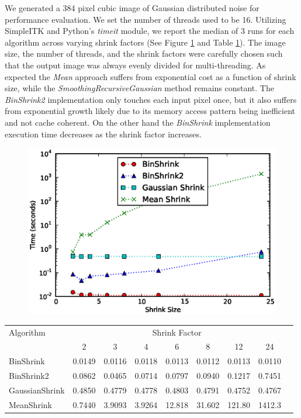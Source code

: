 \documentclass{InsightArticle}
\begin{document}
We generated a 384 pixel cubic image of Gaussian distributed noise for
performance evaluation. We set the number of threads used to be
16. Utilizing SimpleITK and Python's
\textit{timeit} module, we report the median of 3 runs for each
algorithm across varying shrink factors (See Figure
\ref{fig:ShrinkPerformance} and Table \ref{tab:ShrinkPerformance}).  The image size, the number of threads,
and the shrink factors were carefully chosen such that the output
image was always evenly divided for multi-threading. As expected the
\textit{Mean} approach suffers from exponential cost as a function of
shrink size, while the
\textit{SmoothingRecursiveGaussian} method remains constant. The
\textit{BinShrink2} implementation only touches each input pixel once,
but it also suffers from exponential growth likely due to its memory
access pattern being inefficient and not cache coherent. On the other
hand the \textit{BinShrink} implementation execution time decreases as
the shrink factor increases.

\begin{figure}
  \centering
  \includegraphics[width=0.8\linewidth]{images/shrink_time}
  \label{fig:ShrinkPerformance}
\end{figure}

\begin{table}
\begin{center}
\begin{tabular}{l|*{7}{c}r}
Algorithm & \multicolumn{7}{c}{Shrink Factor} \\
  &            2 & 3 & 4 & 6 & 8 & 12 & 24 \\
\hline
BinShrink &     0.0149 & 0.0116 & 0.0118 & 0.0113 & 0.0112 & 0.0113 & 0.0110\\
BinShrink2 &    0.0862 & 0.0465 & 0.0714 & 0.0797 & 0.0940 & 0.1217 & 0.7451\\
GaussianShrink &0.4850 & 0.4779 & 0.4778 & 0.4803 & 0.4791 & 0.4752 & 0.4767\\
MeanShrink &    0.7440 & 3.9093 & 3.9264 & 12.818 & 31.602 & 121.80 & 1412.3\\
\end{tabular}
\label{tab:ShrinkPerformance}
\end{center}
\end{table}
\end{document}
